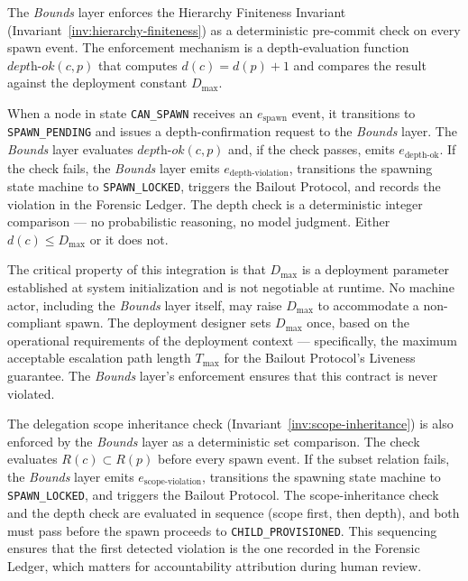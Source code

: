 The \textit{Bounds} layer enforces the Hierarchy Finiteness Invariant
(Invariant~\ref{inv:hierarchy-finiteness}) as a deterministic pre-commit check
on every spawn event. The enforcement mechanism is a depth-evaluation function
$\textit{depth-ok}(c, p)$ that computes $d(c) = d(p) + 1$ and compares the result
against the deployment constant $D_{\max}$.

When a node in state \texttt{CAN\_SPAWN} receives an $e_{\text{spawn}}$ event,
it transitions to \texttt{SPAWN\_PENDING} and issues a depth-confirmation request
to the \textit{Bounds} layer. The \textit{Bounds} layer evaluates
$\textit{depth-ok}(c, p)$ and, if the check passes, emits $e_{\text{depth-ok}}$.
If the check fails, the \textit{Bounds} layer emits $e_{\text{depth-violation}}$,
transitions the spawning state machine to \texttt{SPAWN\_LOCKED}, triggers the
Bailout Protocol, and records the violation in the Forensic Ledger. The depth
check is a deterministic integer comparison — no probabilistic reasoning, no
model judgment. Either $d(c) \leq D_{\max}$ or it does not.

The critical property of this integration is that $D_{\max}$ is a deployment
parameter established at system initialization and is not negotiable at runtime.
No machine actor, including the \textit{Bounds} layer itself, may raise
$D_{\max}$ to accommodate a non-compliant spawn. The deployment designer sets
$D_{\max}$ once, based on the operational requirements of the deployment
context — specifically, the maximum acceptable escalation path length
$T_{\max}$ for the Bailout Protocol's Liveness guarantee. The \textit{Bounds}
layer's enforcement ensures that this contract is never violated.

The delegation scope inheritance check (Invariant~\ref{inv:scope-inheritance})
is also enforced by the \textit{Bounds} layer as a deterministic set comparison.
The check evaluates $R(c) \subset R(p)$ before every spawn event. If the
subset relation fails, the \textit{Bounds} layer emits $e_{\text{scope-violation}}$,
transitions the spawning state machine to \texttt{SPAWN\_LOCKED}, and triggers
the Bailout Protocol. The scope-inheritance check and the depth check are
evaluated in sequence (scope first, then depth), and both must pass before the
spawn proceeds to \texttt{CHILD\_PROVISIONED}. This sequencing ensures that the
first detected violation is the one recorded in the Forensic Ledger, which
matters for accountability attribution during human review.

